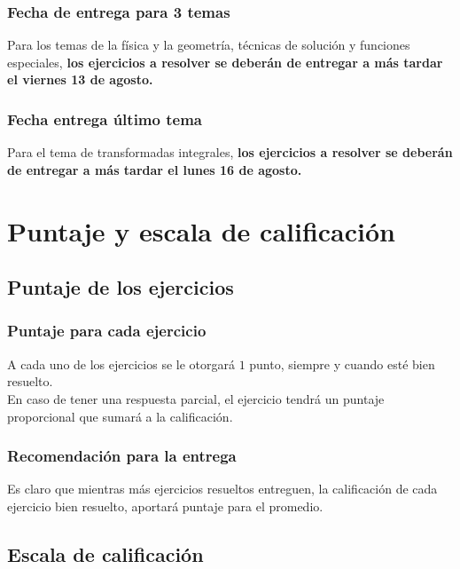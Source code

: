 \documentclass[12pt]{beamer}
\begin{document}
\begin{frame}
\frametitle{Fecha de entrega para 3 temas}
Para los temas de la física y la geometría, técnicas de solución y funciones especiales, \textbf{los ejercicios a resolver se deberán de entregar a más tardar el viernes 13 de agosto.}
\end{frame}
\begin{frame}
\frametitle{Fecha entrega último tema}
Para el tema de transformadas integrales, \textbf{los ejercicios a resolver se deberán de entregar a más tardar el lunes 16 de agosto.}
\end{frame}

\section{Puntaje y escala de calificación}
\subsection{Puntaje de los ejercicios}

\begin{frame}
\frametitle{Puntaje para cada ejercicio}
A cada uno de los ejercicios se le otorgará $1$ punto, siempre y cuando esté bien resuelto.
\\
\bigskip
\pause
En caso de tener una respuesta parcial, el ejercicio tendrá un puntaje proporcional que sumará a la calificación.
\end{frame}
\begin{frame}
\frametitle{Recomendación para la entrega}
Es claro que mientras más ejercicios resueltos entreguen, la calificación de cada ejercicio bien resuelto, aportará puntaje para el promedio.
\end{frame}

\subsection{Escala de calificación}
\end{document}
